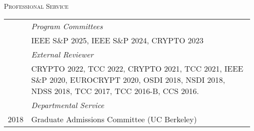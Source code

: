 \documentclass[11pt]{article}
\newenvironment{SectionTableSingleSpace}[1]{
	\renewcommand*{\arraystretch}{1.2}
	\setlength{\tabcolsep}{6pt}
  {\Large \textsc{#1}}
	\begin{longtable}{Rp{5.4in}}}
{\end{longtable}\vspace{-0.2cm}}
\begin{document}
\begin{cv}{\vspace{-5em}}
  \begin{SectionTableSingleSpace}{Professional Service}
    & \emph{Program Committees}\\
      & IEEE S\&P 2025, IEEE S\&P 2024, CRYPTO 2023\\[0.4em]
      
    & \emph{External Reviewer}\\
        & CRYPTO 2022, 
        TCC 2022, 
        CRYPTO 2021, TCC 2021,
        IEEE S\&P 2020,
        EUROCRYPT 2020,
        OSDI 2018,
        NSDI 2018,
        NDSS 2018,
        TCC 2017, 
        TCC 2016-B,
        CCS 2016.\\[0.4em]

    & \emph{Departmental Service}\\
    2018 & Graduate Admissions Committee (UC Berkeley)
  \end{SectionTableSingleSpace}
\end{cv}
\end{document}

